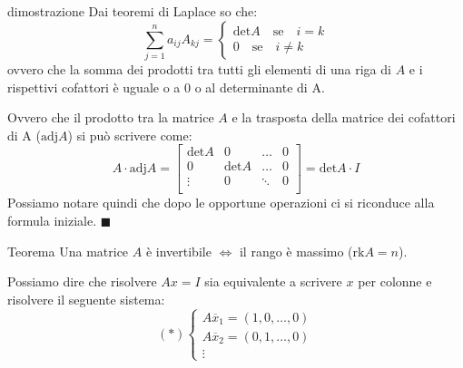 \documentclass[x11names]{article}
\newcommand*{\QEDA}{\null\nobreak\hfill\ensuremath{\blacksquare}}%
\begin{document}
\begin{es}{dimostrazione}
Dai teoremi di Laplace so che:
\[
	\sum_{j=1}^n a_{ij}A_{kj} = \left\{\begin{array}{c} \text{det}A \quad \text{se} \quad i = k \\ 0 \quad \text{se}\quad i \neq k \end{array} \right
.\] 
ovvero che la somma dei prodotti tra tutti gli elementi di una riga di $A$ e i rispettivi cofattori è uguale o a $0$ o al determinante di A.

Ovvero che il prodotto tra la matrice $A$ e la trasposta della matrice dei cofattori di A ($\text{adj}A$) si può scrivere come:
\[
A \cdot \text{adj}A = \begin{bmatrix}
	\text{det}A & 0 & \dots & 0 \\
	0 & \text{det}A & \dots & 0\\
	\vdots & 0 &  \ddots & 0 \\

\end{bmatrix}
= \text{det}A \cdot I
\]
Possiamo notare quindi che dopo le opportune operazioni ci si riconduce alla formula iniziale.
\QEDA
\end{es}


\begin{center}
\colorbox{myred}{\begin{minipage}{5.75in}
\begin{redes}{Teorema}
Una matrice $A$ è invertibile  $\Longleftrightarrow$ il rango è massimo ($\text{rk}A = n$).

Possiamo dire che risolvere $Ax = I$ sia equivalente a scrivere  $x$ per colonne e risolvere il seguente sistema:
\[
	\left(*\right) \left\{ \begin{array}{c} A\overline{x}_{1} = \left(1,0,\dots,0\right) \\ A\overline{x}_{2} = \left(0,1,\dots,0\right) \\ \vdots\end{array}\right
.\] 
\end{redes}
\end{minipage}}        
\end{center}
\end{document}
